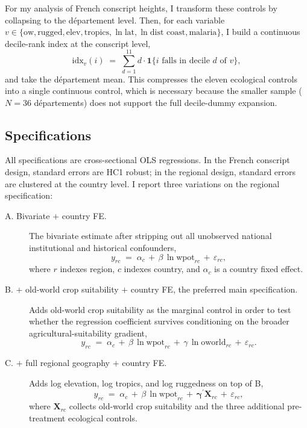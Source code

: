 \documentclass[11pt]{article}
\begin{document}
For my analysis of French conscript heights, I transform these controls by collapsing to the département level. Then, for each variable $v \in \{\text{ow}, \text{rugged}, \text{elev}, \text{tropics}, \ln \text{lat}, \ln \text{dist coast}, \text{malaria}\}$, I build a continuous decile-rank index at the conscript level,
\begin{equation}\label{eq:idx}
\mathrm{idx}_v(i) \;=\; \sum_{d=1}^{11} d \cdot \mathbf{1}\bigl\{i \text{ falls in decile } d \text{ of } v\bigr\},
\end{equation}
and take the département mean. This compresses the eleven ecological controls into a single continuous control, which is necessary because the smaller sample ($N=36$ départements) does not support the full decile-dummy expansion.

\subsection{Specifications}
All specifications are cross-sectional OLS regressions. In the French conscript design, standard errors are HC1 robust; in the regional design, standard errors are clustered at the country level. I report three variations on the regional specification:

\begin{description}
\item[A. Bivariate $+$ country FE.] The bivariate estimate after stripping out all unobserved national institutional and historical confounders,
\begin{equation}\label{eq:specA}
y_{rc} \;=\; \alpha_c \,+\, \beta\,\ln \mathrm{wpot}_{rc} \,+\, \varepsilon_{rc},
\end{equation}
where $r$ indexes region, $c$ indexes country, and $\alpha_c$ is a country fixed effect.

\item[B. $+$ old-world crop suitability $+$ country FE, the preferred main specification.] Adds old-world crop suitability as the marginal control in order to test whether the regression coefficient survives conditioning on the broader agricultural-suitability gradient,
\begin{equation}\label{eq:specB}
y_{rc} \;=\; \alpha_c \,+\, \beta\,\ln \mathrm{wpot}_{rc} \,+\, \gamma\,\ln \mathrm{oworld}_{rc} \,+\, \varepsilon_{rc}.
\end{equation}

\item[C. $+$ full regional geography $+$ country FE.] Adds log elevation, log tropics, and log ruggedness on top of B,
\begin{equation}\label{eq:specC}
y_{rc} \;=\; \alpha_c \,+\, \beta\,\ln \mathrm{wpot}_{rc} \,+\, \boldsymbol{\gamma}^\prime \mathbf{X}_{rc} \,+\, \varepsilon_{rc},
\end{equation}
where $\mathbf{X}_{rc}$ collects old-world crop suitability and the three additional pre-treatment ecological controls.
\end{description}
\end{document}

